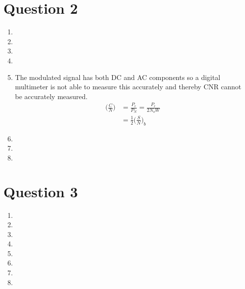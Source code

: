 \documentclass[11pt]{article}
\begin{document}
\section*{Question 2}
\begin{enumerate}[label=(\alph*)]
\item %

\item %

\item %

\item %

\item %
The modulated signal has both DC and AC components so a digital multimeter is not able to measure this accurately and thereby CNR cannot be accurately measured. 
\begin{align*}
    \bigg(\frac{C}{N}\bigg) &= \frac{P_r}{P_N} = \frac{P_r}{2N_oW}\\
    &= \frac{1}{2} \bigg( \frac{S}{N} \bigg)_b
\end{align*}

\item %

\item %

\item %

\end{enumerate}

\section*{Question 3}
\begin{enumerate}[label=(\alph*)]
\item %

\item %

\item %

\item %

\item %

\item %

\item %

\item %

\end{enumerate}
\end{document}
